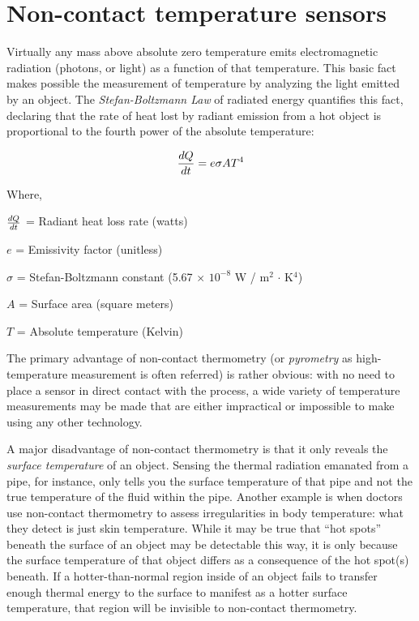 \filbreak
\section{Non-contact temperature sensors}

Virtually any mass above absolute zero temperature emits electromagnetic radiation (photons, or light) as a function of that temperature.  This basic fact makes possible the measurement of temperature by analyzing the light emitted by an object.  The \textit{Stefan-Boltzmann Law} of radiated energy quantifies this fact, declaring that the rate of heat lost by radiant emission from a hot object is proportional to the fourth power of the absolute temperature: 

$${dQ \over dt} = e \sigma A T^4$$

\noindent
Where,

$dQ \over dt$ = Radiant heat loss rate (watts)

$e$ = Emissivity factor (unitless)

$\sigma$ = Stefan-Boltzmann constant (5.67 $\times$ $10^{-8}$ W / m$^{2}$ $\cdot$ K$^{4}$)

$A$ = Surface area (square meters)

$T$ = Absolute temperature (Kelvin)

\vskip 10pt

The primary advantage of non-contact thermometry (or \textit{pyrometry} as high-temperature measurement is often referred) is rather obvious: with no need to place a sensor in direct contact with the process, a wide variety of temperature measurements may be made that are either impractical or impossible to make using any other technology.

A major disadvantage of non-contact thermometry is that it only reveals the \textit{surface temperature} of an object.  Sensing the thermal radiation emanated from a pipe, for instance, only tells you the surface temperature of that pipe and not the true temperature of the fluid within the pipe.  Another example is when doctors use non-contact thermometry to assess irregularities in body temperature: what they detect is just skin temperature.  While it may be true that ``hot spots'' beneath the surface of an object may be detectable this way, it is only because the surface temperature of that object differs as a consequence of the hot spot(s) beneath.  If a hotter-than-normal region inside of an object fails to transfer enough thermal energy to the surface to manifest as a hotter surface temperature, that region will be invisible to non-contact thermometry.

